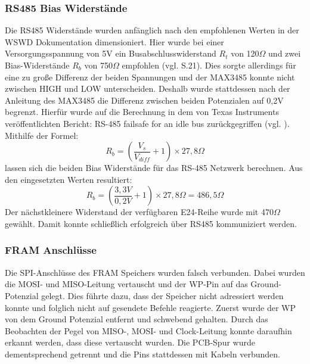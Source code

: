 \subsubsection{RS485 Bias Widerstände}
Die RS485 Widerstände wurden anfänglich nach den empfohlenen Werten in der WSWD Dokumentation dimensioniert. Hier wurde bei einer Versorgungsspannung von 5V ein Busabschlusswiderstand $R_t$ von 120$\Omega$ und zwei Bias-Widerstände $R_b$ von 750$\Omega$ empfohlen (vgl.\cite{WSWD} S.21). Dies sorgte allerdings für eine zu große Differenz der beiden Spannungen und der MAX3485 konnte nicht zwischen HIGH und LOW unterscheiden. Deshalb wurde stattdessen nach der Anleitung des MAX3485 die Differenz zwischen beiden Potenzialen auf 0,2V begrenzt. Hierfür wurde auf die Berechnung in dem von Texas Instruments veröffentlichten Bericht: \glqq{}RS-485 failsafe for an idle bus\grqq{} zurückgegriffen (vgl. \cite{Texas_instruments}). Mithilfe der Formel: 
\begin{equation}
	R_b = (\frac{V_s}{V_{diff }}+1)\times27,8\Omega
\end{equation}
lassen sich die beiden Bias Widerstände für das RS-485 Netzwerk berechnen. Aus den eingesetzten Werten resultiert:
\begin{equation}
	R_b = (\frac{3,3V}{0,2V}+1)\times27,8\Omega = 486,5\Omega
\end{equation}
Der nächstkleinere Widerstand der verfügbaren E24-Reihe wurde mit 470$\Omega$ gewählt. Damit konnte schließlich erfolgreich über RS485 kommuniziert werden.
\subsubsection{FRAM Anschlüsse}
Die SPI-Anschlüsse des FRAM Speichers wurden falsch verbunden. Dabei wurden die \ac{MOSI}- und \ac{MISO}-Leitung vertauscht und der \ac{WP}-Pin auf das Ground-Potenzial gelegt. Dies führte dazu, dass der Speicher nicht adressiert werden konnte und folglich nicht auf gesendete Befehle reagierte. Zuerst wurde der \ac{WP} von dem Ground Potenzial entfernt und schwebend gehalten. Durch das Beobachten der Pegel von MISO-, MOSI- und Clock-Leitung konnte daraufhin erkannt werden, dass diese vertauscht wurden. Die PCB-Spur wurde dementsprechend getrennt und die Pins stattdessen mit Kabeln verbunden.
